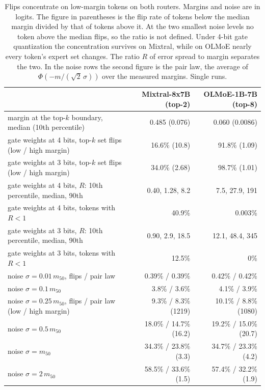 \documentclass[10pt]{article}
\begin{document}
\begin{table}[t]
\centering
\small
\begin{tabular}{lrr}
\toprule
 & Mixtral-8x7B (top-2) & OLMoE-1B-7B (top-8) \\
\midrule
margin at the top-$k$ boundary, median (10th percentile) & 0.485 (0.076) & 0.060 (0.0086) \\
gate weights at 4 bits, top-$k$ set flips (low / high margin) & 16.6\% (10.8) & 91.8\% (1.09) \\
gate weights at 3 bits, top-$k$ set flips (low / high margin) & 34.0\% (2.68) & 98.7\% (1.01) \\
gate weights at 4 bits, $R$: 10th percentile, median, 90th & 0.40, 1.28, 8.2 & 7.5, 27.9, 191 \\
gate weights at 4 bits, tokens with $R < 1$ & 40.9\% & 0.003\% \\
gate weights at 3 bits, $R$: 10th percentile, median, 90th & 0.90, 2.9, 18.5 & 12.1, 48.4, 345 \\
gate weights at 3 bits, tokens with $R < 1$ & 12.5\% & 0\% \\
noise $\sigma = 0.01\,m_{50}$, flips / pair law & 0.39\% / 0.39\% & 0.42\% / 0.42\% \\
noise $\sigma = 0.1\,m_{50}$ & 3.8\% / 3.6\% & 4.1\% / 3.9\% \\
noise $\sigma = 0.25\,m_{50}$, flips / pair law (low / high margin) & 9.3\% / 8.3\% (1219) & 10.1\% / 8.8\% (1080) \\
noise $\sigma = 0.5\,m_{50}$ & 18.0\% / 14.7\% (16.2) & 19.2\% / 15.0\% (20.7) \\
noise $\sigma = m_{50}$ & 34.3\% / 23.8\% (3.3) & 34.7\% / 23.3\% (4.2) \\
noise $\sigma = 2\,m_{50}$ & 58.5\% / 33.6\% (1.5) & 57.4\% / 32.2\% (1.9) \\
\bottomrule
\end{tabular}
\caption{Flips concentrate on low-margin tokens on both routers. Margins and noise are in logits.
The figure in parentheses is the flip rate of tokens below the median margin divided by that of
tokens above it. At the two smallest noise levels no token above the median flips, so the ratio
is not defined. Under 4-bit gate quantization the concentration survives on Mixtral, while on
OLMoE nearly every token's expert set changes. The ratio $R$ of error spread to margin separates
the two. In the noise rows the second figure is the pair law, the average of
$\Phi(-m/(\sqrt2\,\sigma))$ over the measured margins. Single runs.}
\label{tab:route}
\end{table}
\end{document}
